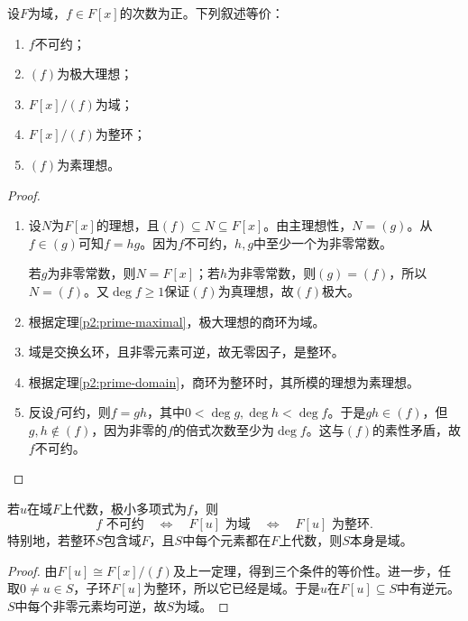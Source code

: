 \begin{theorem}\label{p2:irreducible-maximal}
设$F$为域，$f\in F[x]$的次数为正。下列叙述等价：
\begin{enumerate}
\item $f$不可约；
\item $(f)$为极大理想；
\item $F[x]/(f)$为域；
\item $F[x]/(f)$为整环；
\item $(f)$为素理想。
\end{enumerate}
\end{theorem}
\begin{proof}
\begin{enumerate}
\item[$1)\Rightarrow2)$] 设$N$为$F[x]$的理想，且$(f)\subseteq N\subseteq F[x]$。由主理想性，$N=(g)$。从$f\in(g)$可知$f=hg$。因为$f$不可约，$h,g$中至少一个为非零常数。

若$g$为非零常数，则$N=F[x]$；若$h$为非零常数，则$(g)=(f)$，所以$N=(f)$。又$\deg f\ge1$保证$(f)$为真理想，故$(f)$极大。
\item[$2)\Rightarrow3)$] 根据定理\ref{p2:prime-maximal}，极大理想的商环为域。
\item[$3)\Rightarrow4)$] 域是交换幺环，且非零元素可逆，故无零因子，是整环。
\item[$4)\Rightarrow5)$] 根据定理\ref{p2:prime-domain}，商环为整环时，其所模的理想为素理想。
\item[$5)\Rightarrow1)$] 反设$f$可约，则$f=gh$，其中$0<\deg g,\deg h<\deg f$。于是$gh\in(f)$，但$g,h\notin(f)$，因为非零的$f$的倍式次数至少为$\deg f$。这与$(f)$的素性矛盾，故$f$不可约。
\end{enumerate}
\end{proof}

\begin{corollary}
若$u$在域$F$上代数，极小多项式为$f$，则
\[
f\text{ 不可约}\quad\Longleftrightarrow\quad F[u]\text{ 为域}
\quad\Longleftrightarrow\quad F[u]\text{ 为整环}.
\]
特别地，若整环$S$包含域$F$，且$S$中每个元素都在$F$上代数，则$S$本身是域。
\end{corollary}
\begin{proof}
由$F[u]\cong F[x]/(f)$及上一定理，得到三个条件的等价性。进一步，任取$0\ne u\in S$，子环$F[u]$为整环，所以它已经是域。于是$u$在$F[u]\subseteq S$中有逆元。$S$中每个非零元素均可逆，故$S$为域。
\end{proof}

